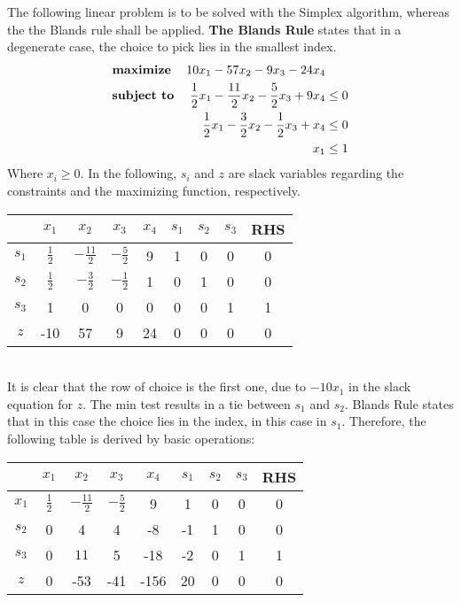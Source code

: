 \documentclass[a4paper,12pt,headsepline]{scrartcl}
\begin{document}
The following linear problem is to be solved with the Simplex algorithm, whereas the the Blands rule shall be applied. \textbf{The Blands Rule} states that in a degenerate case, the choice to pick lies in the smallest index.
\begin{align*}
    &\textbf{\text{maximize}} &10x_1 - 57x_2 - 9x_3 - 24x_4 & \\
    &\textbf{\text{subject to}} & \frac{1}{2}x_1 -  \frac{11}{2} x_2 -  \frac{5}{2}x_3 +  9 x_4 & \leq  0 \\
    & &\frac{1}{2}x_1 -\frac{3}{2}x_2-\frac{1}{2}x_3+x_4&\leq 0 \\
    & &x_1 & \leq 1
\end{align*}
Where $x_i \geq 0$. In the following, $s_i$ and $z$ are slack variables regarding the constraints and the maximizing function, respectively.\\
\begin{tabular}{c|c|c|c|c|c|c|c|c|}
     & $x_1$ & $x_2$ & $x_3$ & $x_4$ & $s_1$ & $s_2$ & $s_3$ & RHS  \\
\hline   $s_1$ & $ \frac{1}{2}$& $-\frac{11}{2} $ &$-\frac{5}{2} $ & 9 & 1&0 & 0 & 0\\
\hline   $s_2$ &$\frac{1}{2} $ &$ -\frac{3}{2} $ & $-\frac{1}{2} $& 1 & 0&1 &0 & 0\\
\hline   $s_3$ & 1 & 0 & 0 & 0 & 0&0 &1 & 1\\
\hline   \hline$z$ & -10 & 57 & 9 & 24 & 0 & 0  & 0 & 0\\
\hline 
\end{tabular}\\     
It is clear that the row of choice is the first one, due to $-10x_1$ in the slack equation for $z$. The min test results in a tie between $s_1$ and $s_2$. Blands Rule states that in this case the choice lies in the index, in this case in $s_1$. Therefore, the following table is derived by basic operations:\\
\begin{tabular}{c|c|c|c|c|c|c|c|c|}
     & $x_1$ & $x_2$ & $x_3$ & $x_4$ & $s_1$ & $s_2$ & $s_3$ & RHS  \\
\hline   $x_1$ & $ \frac{1}{2}$& $-\frac{11}{2} $ &$-\frac{5}{2} $ & 9 & 1&0 & 0 & 0\\
\hline $s_2$ & 0 & 4 & 4 & -8 &-1 &1 & 0 & 0\\
\hline $s_3$ & 0 & $11$ &5 &-18 &-2 & 0&1 & 1\\
\hline  \hline $z$ & 0 & -53 & -41 & -156 & 20 & 0 & 0 & 0\\
\hline 
\end{tabular}\\     
\end{document}
